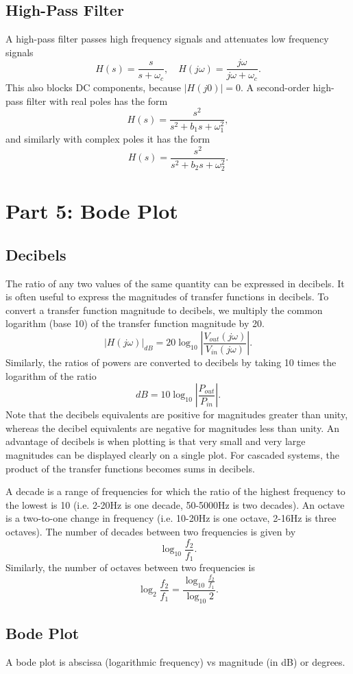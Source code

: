 \documentclass{article}
\begin{document}
\subsection{High-Pass Filter}
A high-pass filter passes high frequency signals and attenuates low frequency signals
\[
    H(s)=\frac{s}{s+\omega _c},\quad H(j\omega )=\frac{j\omega }{j\omega +\omega _c}.
\]
This also blocks DC components, because $\left| H(j0) \right|=0$. A second-order high-pass filter with real poles has the form
\[
    H(s)=\frac{s^2}{s^2+b_1s+\omega _1^2},
\]
and similarly with complex poles it has the form
\[
    H(s)=\frac{s^2}{s^2+b_2s+\omega _2^2}.
\]

\section{Part 5: Bode Plot}
\subsection{Decibels}
The ratio of any two values of the same quantity can be expressed in decibels. It is often useful to express the magnitudes of transfer functions in decibels. To convert a transfer function magnitude to decibels, we multiply the common logarithm (base 10) of the transfer function magnitude by 20.
\[
    \left| H(j\omega ) \right|_{dB}=20 \log_{10}\left| \frac{V_{out}(j\omega )}{V_{in}(j\omega )} \right|.
\]
Similarly, the ratios of powers are converted to decibels by taking 10 times the logarithm of the ratio
\[
    dB=10 \log_{10}\left| \frac{P_{out}}{P_{in}} \right|.
\]
Note that the decibels equivalents are positive for magnitudes greater than unity, whereas the decibel equivalents are negative for magnitudes less than unity. An advantage of decibels is when plotting is that very small and very large magnitudes can be displayed clearly on a single plot. For cascaded systems, the product of the transfer functions becomes sums in decibels.

A decade is a range of frequencies for which the ratio of the highest frequency to the lowest is 10 (i.e. 2-20Hz is one decade, 50-5000Hz is two decades). An octave is a two-to-one change in frequency (i.e. 10-20Hz is one octave, 2-16Hz is three octaves). The number of decades between two frequencies is given by
\[
    \log_{10}\frac{f_2}{f_1}.
\]
Similarly, the number of octaves between two frequencies is
\[
    \log_2 \frac{f_2}{f_1}=\frac{\log_{10}\frac{f_2}{f_1}}{\log_{10}2}.
\]

\subsection{Bode Plot}
A bode plot is abscissa (logarithmic frequency) vs magnitude (in dB) or degrees. 
\end{document}
